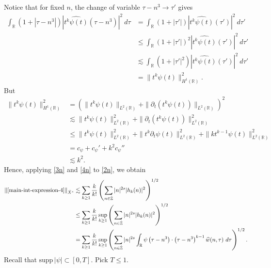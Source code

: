 \documentclass[12pt,reqno]{amsart}
\numberwithin{equation}{section}  %
\numberwithin{figure}{section}
\newcommand{\rr}{\mathbb{R}}
\newcommand{\zz}{\mathbb{Z}}
\newcommand{\zzdot}{\dot{\zz}}
\newcommand{\wh}{\widehat}
\newcommand{\p}{\partial}
\theoremstyle{plain}
\theoremstyle{definition}
\theoremstyle{remark}
\begin{document}
%
%
Notice that for fixed $n$, the change of variable $\tau - n^3 \to \tau'$
gives
%
%
\begin{equation}
	\label{3n}
	\begin{split}
		\int_\rr \left( 1 + | \tau - n^3 | \right) | \wh{t^{k}
		\psi(t)}\left( \tau - n^3 \right) |^2 \ d \tau
		& = \int_\rr \left( 1 + |\tau'| \right) | \wh{t^k \psi(t)}(\tau') |^2 \
		d \tau'
		\\
		& \le \int_\rr \left( 1 + |\tau'| \right)^2 | \wh{t^k \psi(t)}(\tau')
		|^2 \ d \tau'
		\\
		& \lesssim \int_\rr \left( 1 + | \tau' |^2 \right) | \wh{t^{k}
		\psi(t)}(\tau') |^2 \ d \tau'
		\\
		& = \|t^k \psi(t) \|_{H^1(\rr)}^2.
	\end{split}
\end{equation}
%
%
But
%
%
\begin{equation}
	\label{4n}
	\begin{split}
		\|t^k \psi(t) \|_{H^1(\rr)}^2
		& = \left( \|t^k \psi(t)\|_{L^2(\rr)} + \|\p_t \left( t^k \psi(t)
		\right)\|_{L^2(\rr)} \right)^2
		\\
		& \lesssim \|t^{k}\psi(t) \|_{L^2(\rr)}^2 + \|\p_t \left (t^{k}
		\psi(t) \right )\|_{L^2(\rr)}^2
		\\
		& \le \|t^k \psi(t) \|_{L^2(\rr)}^2 + \|t^k \p_t \psi(t)
		\|_{L^2(\rr)}^2 + \|k t^{k -1} \psi(t) \|_{L^2(\rr)}^2
		\\
		& = c_{\psi} + c_{\psi}' + k^2 c_{\psi}''
		\\
		& \lesssim k^2.
	\end{split}
\end{equation}
%
%
Hence, applying \eqref{3n} and \eqref{4n} to \eqref{2n}, we obtain
%
\begin{equation}
	\label{5n}
	\begin{split}
		\|\eqref{main-int-expression-4} \|_{\dot{X}^s}
		& \lesssim
		\sum_{k \ge 1} \frac{k}{k!} \left( \sum_{n \in \zzdot} |n|^{2s} | h_k(n) |^2 
		\right)^{1/2}
		\\
		& \le \sum_{k \ge 1} \frac{k}{k!}
		 \sup_{k \ge 1} \left( \sum_{n \in \zzdot} |n|^{2s} | 
		h_k(n) |^2 \right)^{1/2}
		\\
		& = \sum_{k \ge 1} \frac{k}{k!}  \sup_{k \ge 1} 
		\left( \sum_{n \in \zzdot} |n|^{2s} \int_\rr 
		\psi\left( \tau - n^3 \right) \cdot \left( \tau - n^3 
		\right)^{k -1} \wh{w}(n, \tau) \ d \tau \right)^{1/2}.
	\end{split}
\end{equation}
%
Recall that $\text{supp} \, |\psi| \subset [0, T ]$. Pick $T \le 1$. 
\end{document}
